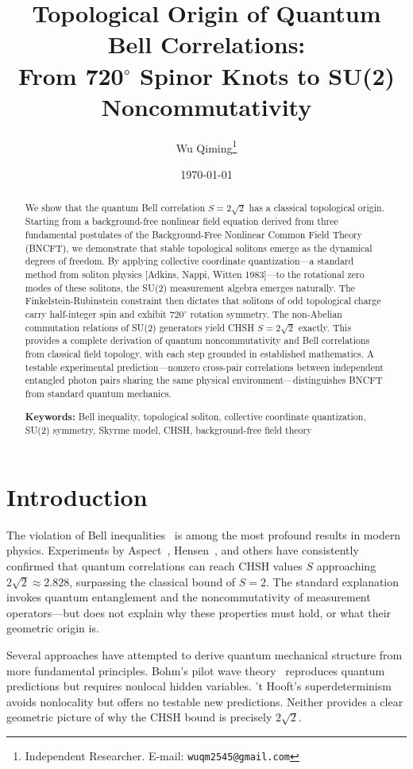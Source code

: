 ﻿\documentclass[11pt,a4paper]{article}
\title{\textbf{Topological Origin of Quantum Bell Correlations:\\[0.3em] From 720$^\circ$ Spinor Knots to SU(2) Noncommutativity}}
\author{Wu Qiming\thanks{Independent Researcher. E-mail: \texttt{wuqm2545@gmail.com}}}
\date{\today}
\begin{document}
\maketitle

\begin{abstract}
\noindent We show that the quantum Bell correlation $S = 2\sqrt{2}$ has a classical topological origin. Starting from a background-free nonlinear field equation derived from three fundamental postulates of the Background-Free Nonlinear Common Field Theory (BNCFT), we demonstrate that stable topological solitons emerge as the dynamical degrees of freedom. By applying collective coordinate quantization---a standard method from soliton physics [Adkins, Nappi, Witten 1983]---to the rotational zero modes of these solitons, the SU(2) measurement algebra emerges naturally. The Finkelstein-Rubinstein constraint then dictates that solitons of odd topological charge carry half-integer spin and exhibit $720^\circ$ rotation symmetry. The non-Abelian commutation relations of SU(2) generators yield CHSH $S = 2\sqrt{2}$ exactly. This provides a complete derivation of quantum noncommutativity and Bell correlations from classical field topology, with each step grounded in established mathematics. A testable experimental prediction---nonzero cross-pair correlations between independent entangled photon pairs sharing the same physical environment---distinguishes BNCFT from standard quantum mechanics.

\bigskip
\noindent\textbf{Keywords:} Bell inequality, topological soliton, collective coordinate quantization, SU(2) symmetry, Skyrme model, CHSH, background-free field theory
\end{abstract}

\section{Introduction}

The violation of Bell inequalities~\cite{bell1964} is among the most profound results in modern physics. Experiments by Aspect~\cite{aspect1982}, Hensen~\cite{hensen2015}, and others have consistently confirmed that quantum correlations can reach CHSH values $S$ approaching $2\sqrt{2} \approx 2.828$, surpassing the classical bound of $S = 2$. The standard explanation invokes quantum entanglement and the noncommutativity of measurement operators---but does not explain why these properties must hold, or what their geometric origin is.

Several approaches have attempted to derive quantum mechanical structure from more fundamental principles. Bohm's pilot wave theory~\cite{bohm1952} reproduces quantum predictions but requires nonlocal hidden variables. 't Hooft's superdeterminism~\cite{thooft2016} avoids nonlocality but offers no testable new predictions. Neither provides a clear geometric picture of why the CHSH bound is precisely $2\sqrt{2}$.
\end{document}
